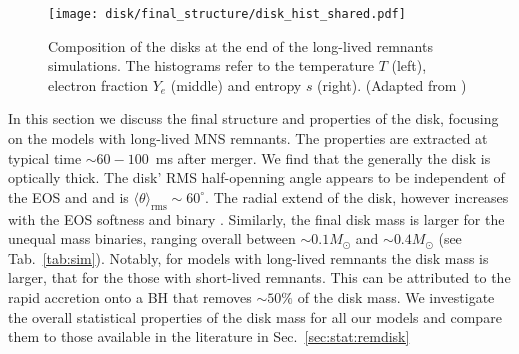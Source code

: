 \begin{figure*}[t]
    \centering 
    \texttt{[image: disk/final\_structure/disk\_hist\_shared.pdf]}
    \caption{Composition of the disks at the end of the long-lived
        remnants simulations. The histograms refer to the temperature $T$
        (left),
        electron fraction $Y_e$
        (middle) and entropy $s$ (right).
        (Adapted from \citet{Nedora:2020pak})
    }
    \label{fig:final_disk_struct_hist_long}
\end{figure*}

In this section we discuss the final structure and properties of the disk, 
focusing on the models with long-lived \ac{MNS} remnants.
The properties are extracted at typical time $\sim60{-}100$~ms after merger.
%
We find that the generally the disk is optically thick.
The disk' \ac{RMS} half-openning angle appears to be independent of the 
\ac{EOS} and \mr{} and is $\langle\theta\rangle_{\text{rms}}\sim60^{\circ}$. 
The radial extend of the disk, however increases with the \ac{EOS} softness and 
binary \mr{}.
%
Similarly, the final disk mass is larger for the unequal mass binaries, 
ranging overall between ${\sim}0.1M_{\odot}$ and ${\sim}0.4M_{\odot}$
(see Tab.~\ref{tab:sim}).
%
Notably, for models with long-lived remnants the disk mass is larger,
that for the those with short-lived remnants. This can be attributed to the 
rapid accretion onto a \ac{BH} that removes $\sim50\%$ of the disk mass.
%
We investigate the overall statistical properties of the disk mass for all our models
and compare them to those available in the literature in Sec.~\ref{sec:stat:remdisk}
%

